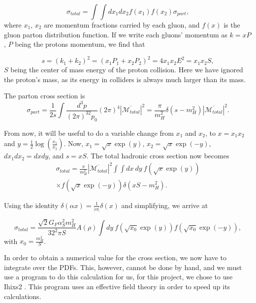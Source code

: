 \documentclass[EPJ,twocolumn]{webofc}
\begin{document}
\begin{equation}
    \sigma_{total} = \int\int dx_1dx_2 f\left(x_1\right)f\left(x_2\right)\sigma_{part},
\end{equation}
where $x_1$, $x_2$ are momentum fractions carried by each gluon, and $f\left(x\right)$ is the gluon parton distribution function.  If we write each gluons' momentum as $k = xP$, $P$  being the protons momentum, we find that

\begin{equation}
    s = (k_1+k_2)^2 =(x_1P_1+x_2P_2)^2  = 4x_1x_2E^2 = x_1x_2S,
\end{equation}
$S$ being the center of mass energy of the proton collision. Here we have ignored the proton's mass, as its energy in colliders  is always much larger than its mass.

The parton cross section is 
\begin{equation}
    \sigma_{part} =\frac{1}{2s} \int \frac{d^3p}{(2\pi)^32p_0}(2\pi)^4 |\overline{\mathcal{M}_{total}}|^2 = \frac{\pi}{m_H^2}\delta\left(s-m_H^2\right)|\overline{\mathcal{M}_{total}}|^2.
\end{equation}

From now, it will be useful to do a variable change from $x_1$ and $x_2$, to $x = x_1x_2$ and $y = \frac{1}{2}\log(\frac{x_1}{x_2})$. Now, $x_1 = \sqrt{x}\exp(y)$, $x_2 = \sqrt{x}\exp(-y)$, $dx_1dx_2 = dxdy$, and $s = xS$. The total hadronic cross section now becomes
\begin{multline}  
    \sigma_{total} = \frac{\pi}{m_H^2}|\overline{\mathcal{M}_{total}}|^2  \int\int dx~dy~ f\left(\sqrt{x}\exp(y)\right) \\ \times f\left(\sqrt{x}\exp(-y)\right)\delta\left(xS-m_H^2\right).
\end{multline}

Using the identity $\delta(\alpha x) = \frac{1}{|\alpha|}\delta(x)$ and simplifying, we arrive at

\begin{equation}
     \sigma_{total} = \frac{\sqrt{2}G_F\alpha_S^2m_H^2}{32^2\pi S}A\left(\rho\right) \int dy~ f\left(\sqrt{x_0}\exp(y)\right)f\left(\sqrt{x_0}\exp(-y)\right),
\end{equation}
with $x_0 = \frac{m_H^2}{S}$.

In order to obtain a numerical value for the cross section, we now have to integrate over the PDFs. This, however, cannot be done by hand, and we must use a program to do this calculation for us, for this project, we chose to use Ihixs2 \cite{Dulat_2018}. This program uses an effective field theory in order to speed up its calculations.
\end{document}
